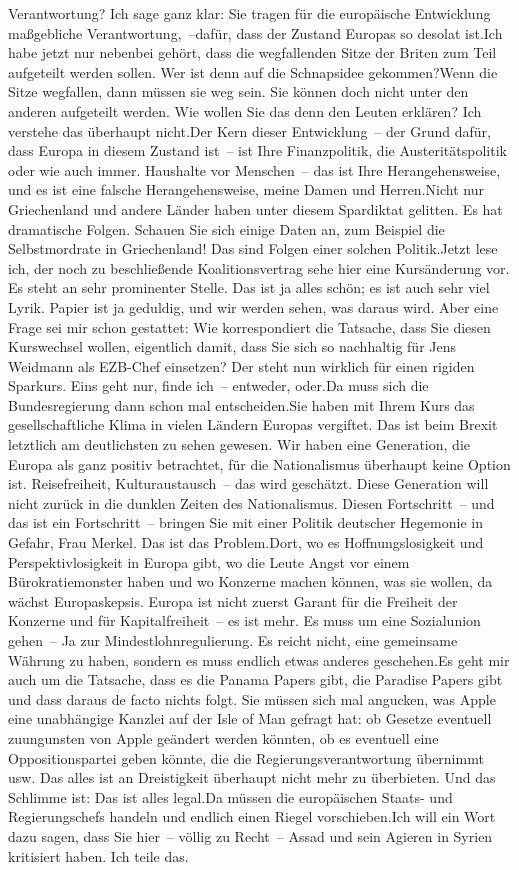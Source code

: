 \documentclass{article}
\begin{document}
Verantwortung? Ich sage ganz klar: Sie tragen für die europäische Entwicklung maßgebliche Verantwortung, –dafür, dass der Zustand Europas so desolat ist.Ich habe jetzt nur nebenbei gehört, dass die wegfallenden Sitze der Briten zum Teil aufgeteilt werden sollen. Wer ist denn auf die Schnapsidee gekommen?Wenn die Sitze wegfallen, dann müssen sie weg sein. Sie können doch nicht unter den anderen aufgeteilt werden. Wie wollen Sie das denn den Leuten erklären? Ich verstehe das überhaupt nicht.Der Kern dieser Entwicklung – der Grund dafür, dass Europa in diesem Zustand ist – ist Ihre Finanzpolitik, die Austeritätspolitik oder wie auch immer. Haushalte vor Menschen – das ist Ihre Herangehensweise, und es ist eine falsche Herangehensweise, meine Damen und Herren.Nicht nur Griechenland und andere Länder haben unter diesem Spardiktat gelitten. Es hat dramatische Folgen. Schauen Sie sich einige Daten an, zum Beispiel die Selbstmordrate in Griechenland! Das sind Folgen einer solchen Politik.Jetzt lese ich, der noch zu beschließende Koalitionsvertrag sehe hier eine Kursänderung vor. Es steht an sehr prominenter Stelle. Das ist ja alles schön; es ist auch sehr viel Lyrik. Papier ist ja geduldig, und wir werden sehen, was daraus wird. Aber eine Frage sei mir schon gestattet: Wie korrespondiert die Tatsache, dass Sie diesen Kurswechsel wollen, eigentlich damit, dass Sie sich so nachhaltig für Jens Weidmann als EZB-Chef einsetzen? Der steht nun wirklich für einen rigiden Sparkurs. Eins geht nur, finde ich – entweder, oder.Da muss sich die Bundesregierung dann schon mal entscheiden.Sie haben mit Ihrem Kurs das gesellschaftliche Klima in vielen Ländern Europas vergiftet. Das ist beim Brexit letztlich am deutlichsten zu sehen gewesen. Wir haben eine Generation, die Europa als ganz positiv betrachtet, für die Nationalismus überhaupt keine Option ist. Reisefreiheit, Kulturaustausch – das wird geschätzt. Diese Generation will nicht zurück in die dunklen Zeiten des Nationalismus. Diesen Fortschritt – und das ist ein Fortschritt – bringen Sie mit einer Politik deutscher Hegemonie in Gefahr, Frau Merkel. Das ist das Problem.Dort, wo es Hoffnungslosigkeit und Perspektivlosigkeit in Europa gibt, wo die Leute Angst vor einem Bürokratiemonster haben und wo Konzerne machen können, was sie wollen, da wächst Europaskepsis. Europa ist nicht zuerst Garant für die Freiheit der Konzerne und für Kapitalfreiheit – es ist mehr. Es muss um eine Sozial­union gehen – Ja zur Mindestlohnregulierung. Es reicht nicht, eine gemeinsame Währung zu haben, sondern es muss endlich etwas anderes geschehen.Es geht mir auch um die Tatsache, dass es die Panama Papers gibt, die Paradise Papers gibt und dass daraus de facto nichts folgt. Sie müssen sich mal angucken, was Apple eine unabhängige Kanzlei auf der Isle of Man gefragt hat: ob Gesetze eventuell zuungunsten von Apple geändert werden könnten, ob es eventuell eine Oppositionspartei geben könnte, die die Regierungsverantwortung übernimmt usw. Das alles ist an Dreistigkeit überhaupt nicht mehr zu überbieten. Und das Schlimme ist: Das ist alles legal.Da müssen die europäischen Staats- und Regierungschefs handeln und endlich einen Riegel vorschieben.Ich will ein Wort dazu sagen, dass Sie hier – völlig zu Recht – Assad und sein Agieren in Syrien kritisiert haben. Ich teile das. 
\end{document}
